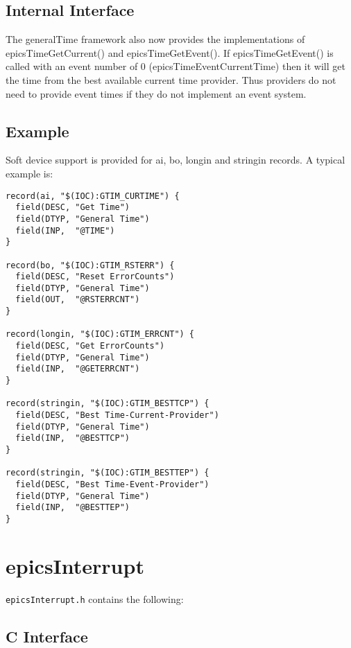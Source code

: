 \subsection{Internal Interface}

The generalTime framework also now provides the implementations of epicsTimeGetCurrent() and epicsTimeGetEvent(). 
If epicsTimeGetEvent() is called with an event number of 0 (epicsTimeEventCurrentTime) then it will get the time from 
the best available current time provider.  Thus providers do not need to provide event times if they do not implement an 
event system.

\subsection{Example}

Soft device support is provided for ai, bo, longin and stringin records. A typical example is:

\begin{verbatim}record(ai, "$(IOC):GTIM_CURTIME") {
  field(DESC, "Get Time")
  field(DTYP, "General Time")
  field(INP,  "@TIME")
}

record(bo, "$(IOC):GTIM_RSTERR") {
  field(DESC, "Reset ErrorCounts")
  field(DTYP, "General Time")
  field(OUT,  "@RSTERRCNT")
}

record(longin, "$(IOC):GTIM_ERRCNT") {
  field(DESC, "Get ErrorCounts")
  field(DTYP, "General Time")
  field(INP,  "@GETERRCNT")
}

record(stringin, "$(IOC):GTIM_BESTTCP") {
  field(DESC, "Best Time-Current-Provider")
  field(DTYP, "General Time")
  field(INP,  "@BESTTCP")
}

record(stringin, "$(IOC):GTIM_BESTTEP") {
  field(DESC, "Best Time-Event-Provider")
  field(DTYP, "General Time")
  field(INP,  "@BESTTEP")
}
\end{verbatim}\section{epicsInterrupt}

\verb|epicsInterrupt.h| contains the following:

\subsection{C Interface}

